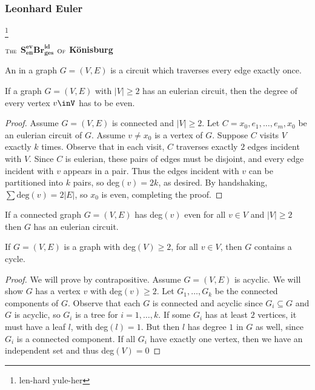 \documentclass[11pt]{scrartcl}
\begin{document}
\subsubsection{Leonhard Euler}\footnote{len-hard yule-her}
\begin{example}
    $_{\textsc{The}}$ $\textbf{S}^\textbf{ev}_\textbf{en} \textbf{Br}^\textbf{id}_\textbf{ges}$ $_{\textsc{Of}}$ \textbf{Könisburg}
\end{example}
\begin{definition}
    An  in a graph $G= (V, E)$ is a circuit which traverses every edge exactly once.
\end{definition}
\begin{theorem}
    If a graph $G=(V, E)$ with $|V|\geq 2$ has an eulerian circuit, then the degree of every vertex $v\inV$ has to be even.
\end{theorem}
\begin{proof}
    Assume $G=(V, E)$ is connected and $|V| \geq 2$.  Let $C = x_0, e_1, \dots, e_m, x_0$  be an eulerian circuit of $G$. Assume $v \neq x_0$ is a vertex of $G$.  Suppose $C$ visits $V$ exactly $k$ times. Observe that in each visit, $C$ traverses exactly $2$ edges incident with $V$. Since $C$ is eulerian, these pairs of edges must be disjoint, and every edge incident with $v$ appears in a pair.  Thus the edges incident with $v$ can be partitioned into $k$ pairs, so deg$(v) = 2k$, as desired.  By handshaking, $\sum \text{deg}(v) = 2|E|$, so $x_0 $ is even, completing the proof.
\end{proof}
\begin{theorem}
    If a connected graph $G=(V, E)$ has deg$(v)$ even for all $v \in V$ and $|V| \geq 2$ then $G$ has an eulerian circuit.
\end{theorem}
\begin{lemma}
    If $G=(V, E)$ is a graph with deg$(V) \geq 2$, for all $v \in V$, then $G$ contains a cycle.
\end{lemma}
\begin{proof}
    We will prove by contrapositive. Assume $G = (V, E)$ is acyclic. We will show $G$ has a vertex $v$ with deg$(v) \geq 2$.  Let $G_1, \dots, G_k$ be the connected components of $G$. Observe that each $G$ is connected and acyclic since $G_i \subseteq G$ and $G$ is acyclic, so $G_i$ is a tree for $i=1, \dots, k$. If some $G_i$ has at least $2$ vertices, it must have a leaf $l$, with deg$(l)=1$.  But then $l$ has degree $1$ in $G$ as well, since $G_i$ is a connected component. If all $G_i$ have exactly one vertex, then we have an independent set and thus deg$(V)=0$
\end{proof}
\end{document}
